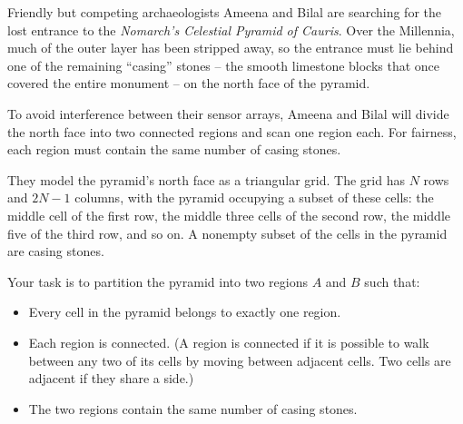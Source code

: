


Friendly but competing archaeologists Ameena and Bilal are searching for the lost entrance to the \emph{Nomarch's Celestial Pyramid of Cauris}.
Over the Millennia, much of the outer layer has been stripped away, so the entrance must lie behind one of the remaining ``casing'' stones -- the smooth limestone blocks that once covered the entire monument -- on the north face of the pyramid.

To avoid interference between their sensor arrays, Ameena and Bilal will divide the north face into two connected regions and scan one region each. 
For fairness, each region must contain the same number of casing stones.

They model the pyramid's north face as a triangular grid.
The grid has $N$ rows and $2N - 1$ columns, with the pyramid occupying a subset of these cells: the middle cell of the first row, the middle three cells of the second row, the middle five of the third row, and so on. 
A nonempty subset of the cells in the pyramid are casing stones.

Your task is to partition the pyramid into two regions $A$ and $B$ such that:
\begin{itemize}
\item Every cell in the pyramid belongs to exactly one region.
\item Each region is connected.
  (A region is connected if it is possible to walk between any two of its cells by moving between adjacent cells.
    Two cells are adjacent if they share a side.)
\item The two regions contain the same number of casing stones.
\end{itemize}


